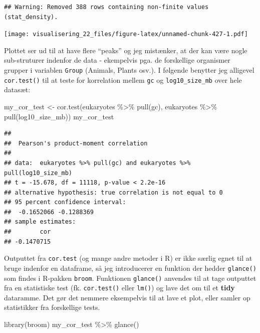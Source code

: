 \documentclass[
]{book}
\newenvironment{Shaded}{\begin{snugshade}}{\end{snugshade}}
\newcommand{\FunctionTok}[1]{\textcolor[rgb]{0.00,0.00,0.00}{#1}}
\newcommand{\NormalTok}[1]{#1}
\newcommand{\OtherTok}[1]{\textcolor[rgb]{0.56,0.35,0.01}{#1}}
\newcommand{\SpecialCharTok}[1]{\textcolor[rgb]{0.00,0.00,0.00}{#1}}
\begin{document}
\begin{verbatim}
## Warning: Removed 388 rows containing non-finite values (stat_density).
\end{verbatim}

\texttt{[image: visualisering\_22\_files/figure-latex/unnamed-chunk-427-1.pdf]}

Plottet ser ud til at have flere ``peaks'' og jeg mistænker, at der kan være nogle sub-struturer indenfor de data - ekempelvis pga. de forskellige organismer grupper i variablen \texttt{Group} (Animals, Plants osv.). I følgende benytter jeg alligevel \texttt{cor.test()} til at teste for korrelation mellem \texttt{gc} og \texttt{log10\_size\_mb} over hele datasæt:

\begin{Shaded}
\begin{Highlighting}[]
\NormalTok{my\_cor\_test }\OtherTok{\textless{}{-}} \FunctionTok{cor.test}\NormalTok{(eukaryotes }\SpecialCharTok{\%\textgreater{}\%} \FunctionTok{pull}\NormalTok{(gc),}
\NormalTok{                        eukaryotes }\SpecialCharTok{\%\textgreater{}\%} \FunctionTok{pull}\NormalTok{(log10\_size\_mb))}
\NormalTok{my\_cor\_test}
\end{Highlighting}
\end{Shaded}

\begin{verbatim}
## 
##  Pearson's product-moment correlation
## 
## data:  eukaryotes %>% pull(gc) and eukaryotes %>% pull(log10_size_mb)
## t = -15.678, df = 11118, p-value < 2.2e-16
## alternative hypothesis: true correlation is not equal to 0
## 95 percent confidence interval:
##  -0.1652066 -0.1288369
## sample estimates:
##        cor 
## -0.1470715
\end{verbatim}

Outputtet fra \texttt{cor.test} (og mange andre metoder i R) er ikke særlig egnet til at bruge indenfor en dataframe, så jeg introducerer en funktion der hedder \texttt{glance()} som findes i R-pakken \texttt{broom}. Funktionen \texttt{glance()} anvendes til at tage outputtet fra en statistiske test (fk. \texttt{cor.test()} eller \texttt{lm()}) og lave det om til et \textbf{tidy} dataramme. Det gør det nemmere eksempelvis til at lave et plot, eller samler op statistikker fra forskellige tests.

\begin{Shaded}
\begin{Highlighting}[]
\FunctionTok{library}\NormalTok{(broom)}
\NormalTok{my\_cor\_test }\SpecialCharTok{\%\textgreater{}\%} \FunctionTok{glance}\NormalTok{()}
\end{Highlighting}
\end{Shaded}
\end{document}
